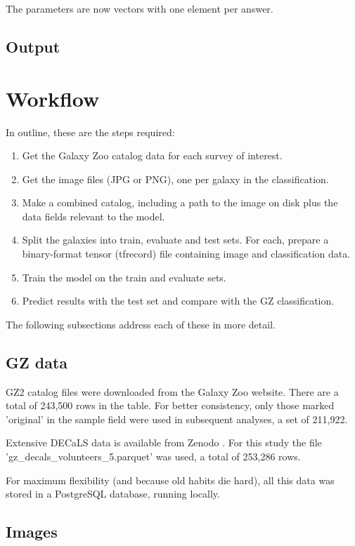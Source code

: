 \documentclass[preprint]{aastex631}
\newcommand{\todo}{\color{red}{TODO}\color{black}\hspace{2mm}}
\begin{document}
The parameters are now vectors with one element per answer.

\subsection{Output}

\todo
\section{Workflow}

In outline, these are the steps required:

\begin{enumerate}
	\item Get the Galaxy Zoo catalog data for each survey of interest.
	\item Get the image files (JPG or PNG), one per galaxy in the classification.
	\item Make a combined catalog, including a path to the image on disk plus the data fields relevant to the model.
	\item Split the galaxies into train, evaluate and test sets. For each, prepare a binary-format tensor (tfrecord) file containing image and classification data.
	\item Train the model on the train and evaluate sets.
	\item Predict results with the test set and compare with the GZ classification.
\end{enumerate}

The following subsections address each of these in more detail.

\subsection{GZ data}

GZ2 catalog files were downloaded from the Galaxy Zoo website.
There are a total of 243,500 rows in the table. For better consistency, only those marked 'original' in the sample field were used in subsequent analyses, a set of 211,922.

Extensive DECaLS data is available from Zenodo \citep{walmsley_mike_2020_4573248}. For this study the file 'gz\_decals\_volunteers\_5.parquet' was used, a total of 253,286 rows.

For maximum flexibility (and because old habits die hard), all this data was stored in a PostgreSQL database, running locally.

\subsection{Images} \label{images}
\end{document}
